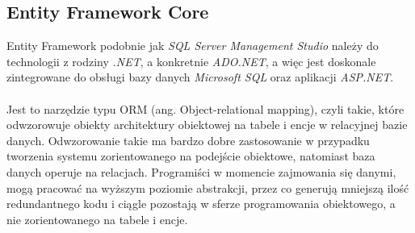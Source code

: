     \subsection{Entity Framework Core}
    Entity Framework podobnie jak \textit{SQL Server Management Studio} należy do technologii z rodziny \textit{.NET}, a konkretnie \textit{ADO.NET}, a więc jest doskonale zintegrowane do obsługi bazy danych \textit{Microsoft SQL} oraz aplikacji \textit{ASP.NET}.
    \\
    \\
    Jest to narzędzie typu ORM (ang. Object-relational mapping), czyli takie, które odwzorowuje obiekty architektury obiektowej na tabele i encje w relacyjnej bazie danych. Odwzorowanie takie ma bardzo dobre zastosowanie w przypadku tworzenia systemu zorientowanego na podejście obiektowe, natomiast baza danych operuje na relacjach. Programiści w momencie zajmowania się danymi, mogą pracować na wyższym poziomie abstrakcji, przez co generują mniejszą ilość redundantnego kodu i ciągle pozostają w sferze programowania obiektowego, a nie zorientowanego na tabele i encje.